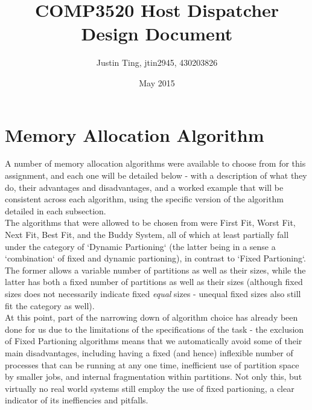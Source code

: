 \documentclass[11pt]{article}
\title {COMP3520 Host Dispatcher Design Document}
\author {Justin Ting, jtin2945, 430203826}
\date {May 2015}
\begin{document}
\maketitle

\pagebreak
\section{Memory Allocation Algorithm}

\iffalse
(Provides a thorough description of ALL prescribed memory allocation schemes - 6 marks)
(Provides an informed discussion of the advantages and disadvantages of these schemes)
For each: pros, cons, examples
a. Describe and discuss what memory allocation algorithms you could have used
and justify your final design choice
\fi

A number of memory allocation algorithms were available to choose from for this assignment, and each one will be detailed below - with a description of what they do, their advantages and disadvantages, and a worked example that will be consistent across each algorithm, using the specific version of the algorithm detailed in each subsection.\\

The algorithms that were allowed to be chosen from were First Fit, Worst Fit, Next Fit, Best Fit, and the Buddy System, all of which at least partially fall under the category of `Dynamic Partioning` (the latter being in a sense a `combination` of fixed and dynamic partioning), in contrast to `Fixed Partioning`. The former allows a variable number of partitions as well as their sizes, while the latter has both a fixed number of partitions as well as their sizes (although fixed sizes does not necessarily indicate fixed \textit{equal} sizes - unequal fixed sizes also still fit the category as well).\\

At this point, part of the narrowing down of algorithm choice has already been done for us due to the limitations of the specifications of the task - the exclusion of Fixed Partioning algorithms means that we automatically avoid some of their main disadvantages, including having a fixed (and hence) inflexible number of processes that can be running at any one time, inefficient use of partition space by smaller jobs, and internal fragmentation within partitions. Not only this, but virtually no real world systems still employ the use of fixed partioning, a clear indicator of its ineffiencies and pitfalls.\\
\iffalse reference the textbook here, page 314\fi
\end{document}
